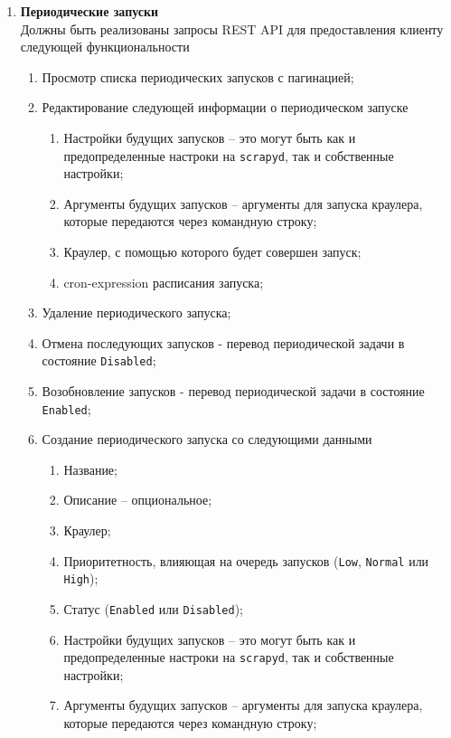 \begin{enumerate}
		\item \textbf{Периодические запуски\\}
		Должны быть реализованы запросы REST API для предоставления клиенту следующей функциональности
		\begin{enumerate}
		    \item Просмотр списка периодических запусков с пагинацией;
		    \item Редактирование следующей информации о периодическом запуске
		    \begin{enumerate}
		        \item Настройки будущих запусков --  это могут быть как и предопределенные настроки на \texttt{scrapyd}, так и собственные настройки;
		        \item Аргументы будущих запусков -- аргументы для запуска краулера, которые передаются через командную строку;
		        \item Краулер, с помощью которого будет совершен запуск;
		        \item cron-expression расписания запуска;
		    \end{enumerate}
		    \item Удаление периодического запуска;
		    \item Отмена последующих запусков - перевод периодической задачи в состояние \texttt{Disabled};
		    \item Возобновление запусков - перевод периодической задачи в состояние \texttt{Enabled};
		    \item Создание периодического запуска со следующими данными
		    \begin{enumerate}
		        \item Название;
		        \item Описание -- опциональное;
		        \item Краулер;
		        \item Приоритетность, влияющая на очередь запусков (\texttt{Low}, \texttt{Normal} или \texttt{High});
		        \item Статус (\texttt{Enabled} или \texttt{Disabled});
		        \item Настройки будущих запусков --  это могут быть как и предопределенные настроки на \texttt{scrapyd}, так и собственные настройки;
		        \item Аргументы будущих запусков -- аргументы для запуска краулера, которые передаются через командную строку;
		    \end{enumerate}
		\end{enumerate}
	
	\end{enumerate}

		
	
	